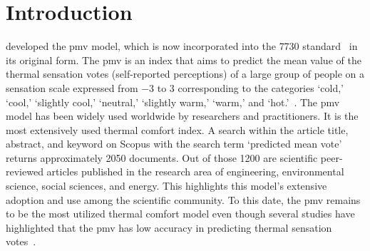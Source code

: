 \section{Introduction}\label{sec:introduction}


 developed the \ac{pmv} model, which is now incorporated into the \gls{7730} standard~\cite{iso7730} in its original form.
The \ac{pmv} is an index that aims to predict the mean value of the thermal sensation votes (self-reported perceptions) of a large group of people on a sensation scale expressed from \num{-3} to \num{3} corresponding to the categories `cold,' `cool,' `slightly cool,' `neutral,' `slightly warm,' `warm,' and `hot.'~\cite{iso7730, ashrae552023}.
The \ac{pmv} model has been widely used worldwide by researchers and practitioners.
It is the most extensively used thermal comfort index.
A search within the article title, abstract, and keyword on Scopus with the search term `predicted mean vote' returns approximately \num{2050} documents.
Out of those \num{1200} are scientific peer-reviewed articles published in the research area of engineering, environmental science, social sciences, and energy.
This highlights this model's extensive adoption and use among the scientific community.
To this date, the \ac{pmv} remains to be the most utilized thermal comfort model even though several studies have highlighted that the \ac{pmv} has low accuracy in predicting thermal sensation votes~\cite{Cheung2019, Yao2022, Humphreys2002, doherty_evaluation_1988}.

